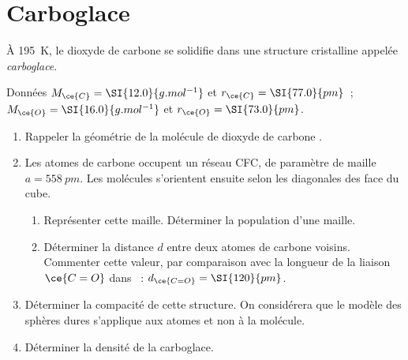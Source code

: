 \documentclass[a4paper, 10pt, final, garamond]{book}
\begin{document}
\section{Carboglace}
À \SI{195}{K}, le dioxyde de carbone se solidifie dans une structure cristalline
appelée \textit{carboglace}.
\begin{rdefi}{Données}
  $M_{\ce{C}} = \SI{12.0}{g.mol^{-1}}$ et $r_{\ce{C}} = \SI{77.0}{pm}$~;
  $M_{\ce{O}} = \SI{16.0}{g.mol^{-1}}$ et $r_{\ce{O}} = \SI{73.0}{pm}$.
\end{rdefi}
\begin{enumerate}
  \item Rappeler la géométrie de la molécule de dioxyde de carbone .
  \item Les atomes de carbone occupent un réseau CFC, de paramètre de maille $a
    = \SI{558}{pm}$. Les molécules s'orientent ensuite selon les diagonales des
    face du cube.
    \begin{enumerate}
      \item Représenter cette maille. Déterminer la population d'une maille.
      \item Déterminer la distance $d$ entre deux atomes de carbone voisins.
        Commenter cette valeur, par comparaison avec la longueur de la liaison
        $\ce{C=O}$ dans ~: $d_{\ce{C=O}} = \SI{120}{pm}$.
    \end{enumerate}
  \item Déterminer la compacité de cette structure. On considérera que le modèle
    des sphères dures s'applique aux atomes et non à la molécule.
  \item Déterminer la densité de la carboglace.
\end{enumerate}
\end{document}
